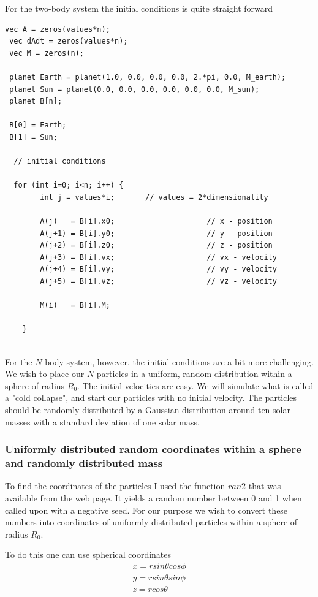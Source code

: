 \documentclass[a4paper,12pt, english]{article}
\begin{document}
For the two-body system the initial conditions is quite straight forward

 \begin{lstlisting}[title={Initial conditions two-body system}]
 vec A = zeros(values*n);
 vec dAdt = zeros(values*n);
 vec M = zeros(n);

 planet Earth = planet(1.0, 0.0, 0.0, 0.0, 2.*pi, 0.0, M_earth);
 planet Sun = planet(0.0, 0.0, 0.0, 0.0, 0.0, 0.0, M_sun);
 planet B[n];

 B[0] = Earth;
 B[1] = Sun;

  // initial conditions

  for (int i=0; i<n; i++) {
        int j = values*i;		// values = 2*dimensionality
       
        A(j)   = B[i].x0;                     // x - position
        A(j+1) = B[i].y0;                     // y - position
        A(j+2) = B[i].z0;                     // z - position
        A(j+3) = B[i].vx;                     // vx - velocity
        A(j+4) = B[i].vy;                     // vy - velocity
        A(j+5) = B[i].vz;                     // vz - velocity

        M(i)   = B[i].M;
        
    }
 
 \end{lstlisting}
 
 
For the $N$-body system, however, the initial conditions are a bit more challenging. We wish to place our $N$ particles in a uniform, random distribution within a sphere of radius $R_0$. The initial velocities are easy. We will simulate what is called a "cold collapse", and start our particles with no initial velocity. The particles should be randomly distributed by a Gaussian distribution around ten solar masses with a standard deviation of one solar mass.  


\subsubsection*{Uniformly distributed random coordinates within a sphere and randomly distributed mass}

To find the coordinates of the particles I used the function $ran2$ that was available from the web page. It yields a random number between 0 and 1 when called upon with a negative seed. For our purpose we wish to convert these numbers into coordinates of uniformly distributed particles within a sphere of radius $R_0$. 

To do this one can use spherical coordinates
\begin{align}
x = r sin \theta cos \phi \\
y = r sin \theta sin \phi \\
z = r cos \theta
\end{align}
\end{document}
